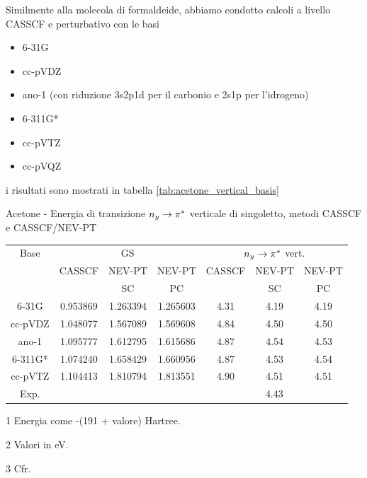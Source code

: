 Similmente alla molecola di formaldeide, abbiamo condotto calcoli a
livello CASSCF e perturbativo con le basi
\begin{itemize}
 \item 6-31G
 \item cc-pVDZ
 \item ano-1 (con riduzione 3s2p1d per il carbonio e 2s1p per l'idrogeno)
 \item 6-311G* 
 \item cc-pVTZ
 \item cc-pVQZ
\end{itemize}
i risultati sono mostrati in tabella \ref{tab:acetone_vertical_basis}
\begin{center}
\begin{threeparttable}
\caption{\small Acetone - Energia di transizione $n_y \rightarrow \pi^{*}$ verticale di singoletto, metodi CASSCF e CASSCF/NEV-PT}
\label{tab:acetone_vertical_basis}
{
\small
\begin{tabular}{|c|ccc|ccc|}
\hline
 Base	& \multicolumn{3}{c|}{GS\tnote{1}}				& \multicolumn{3}{c|}{$n_y \rightarrow \pi^{*}$ vert.\tnote{2}} \\
		& CASSCF		& NEV-PT	& NEV-PT	& CASSCF		& NEV-PT & NEV-PT \\
		& 				& SC		& PC		&				& SC 	&	 PC \\
\hline
6-31G	& 0.953869		& 1.263394		& 1.265603		& 4.31			& 4.19		& 4.19		    \\
cc-pVDZ	& 1.048077		& 1.567089		& 1.569608		& 4.84			& 4.50		& 4.50			\\
ano-1	& 1.095777		& 1.612795		& 1.615686 		& 4.87			& 4.54 		& 4.53			\\
6-311G*	& 1.074240		& 1.658429		& 1.660956		& 4.87 			& 4.53		& 4.54 			\\
cc-pVTZ & 1.104413		& 1.810794		& 1.813551		& 4.90			& 4.51 		& 4.51			\\
\hline
\hline
Exp.\tnote{3}	&				& 				&				& \multicolumn{3}{c|}{4.43} \\
\hline
\end{tabular}
}
\begin{tablenotes}
\small
 \item[1] Energia come -(191 + valore) Hartree.
 \item[2] Valori in eV.
 \item[3] Cfr. \cite{cpl-241-0-1995-26}
\end{tablenotes}
\end{threeparttable}
\end{center}


